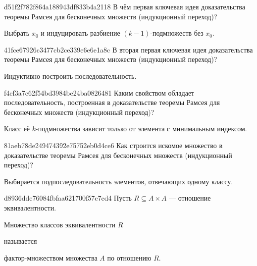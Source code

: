 \begin{note}{d51f2f782f864a188943df833b4a2118}
    В чём первая ключевая идея доказательства теоремы Рамсея для бесконечных множеств (индукционный переход)?

    \begin{cloze}{1}
        Выбрать \({ x_0 }\) и индуцировать разбиение \({ (k-1) }\)-под\-мно\-жеств без \({ x_0 }\).
    \end{cloze}
\end{note}

\begin{note}{41fce67926c3477cb2ce339e6e6e1a8c}
    В вторая первая ключевая идея доказательства теоремы Рамсея для бесконечных множеств (индукционный переход)?

    \begin{cloze}{1}
        Индуктивно построить последовательность.
    \end{cloze}
\end{note}

\begin{note}{f4cf3a7c62f54bd3984be24ba0826481}
    Каким свойством обладает последовательность, построенная в доказательстве теоремы Рамсея для бесконечных множеств (индукционный переход)?

    \begin{cloze}{1}
        Класс её \({ k }\)-подмножества зависит только от элемента с минимальным индексом.
    \end{cloze}
\end{note}

\begin{note}{81aeb78de249474392e75752eb0d4ce6}
    Как строится искомое множество в доказательстве теоремы Рамсея для бесконечных множеств (индукционный переход)?

    \begin{cloze}{1}
        Выбирается подпоследовательность элементов, отвечающих одному классу.
    \end{cloze}
\end{note}

\begin{note}{d8936dde76084fbfaa621700f57c7cd4}
    Пусть \({ R \subseteq A \times A }\) --- отношение эквивалентности.
    \begin{icloze}{2}Множество классов эквивалентности \({ R }\)\end{icloze} называется \begin{icloze}{1}фактор-множеством множества \({ A }\) по отношению \({ R }\).\end{icloze}
\end{note}

